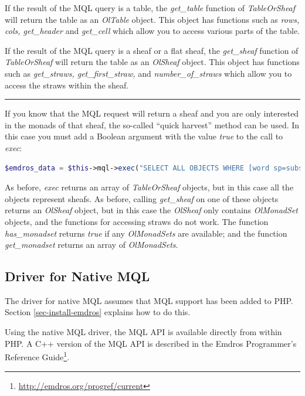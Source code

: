 \documentclass[11pt,oneside,a4paper]{memoir}
\begin{document}
If the result of the MQL query is a table, the \emph{get\_table} function of \emph{TableOrSheaf}
will return the table as an \emph{OlTable} object.  This object has functions
such as \emph{rows, cols, get\_header} and \emph{get\_cell} which allow you to
access various parts of the table.

If the result of the MQL query is a sheaf or a flat sheaf, the \emph{get\_sheaf} function of
\emph{TableOrSheaf} will return the table as an \emph{OlSheaf} object. This object has functions
such as \emph{get\_straws, get\_first\_straw,} and \emph{number\_of\_straws} which allow you to
access the straws within the sheaf.

\pfbreak

If you know that the MQL request will return a sheaf and you are only interested in the monads of
that sheaf, the so-called ``quick harvest'' method can be used. In
this case you must add a Boolean argument with the value \emph{true} to the call to \emph{exec}:

\begin{lstlisting}[language=PHP]
$emdros_data = $this->mql->exec("SELECT ALL OBJECTS WHERE [word sp=subs] GOqxqxqx", true);
\end{lstlisting}

As before, \emph{exec} returns an array of \emph{TableOrSheaf} objects, but in this case all the
objects represent sheafs. As before, calling \emph{get\_sheaf} on one of these objects returns an
\emph{OlSheaf} object, but in this case the \emph{OlSheaf} only contains \emph{OlMonadSet} objects, and the
functions for accessing straws do not work. The function \emph{has\_monadset} returns \emph{true} if
any \emph{OlMonadSets} are available; and the function \emph{get\_monadset} returns an array of
\emph{OlMonadSets}.

\subsection{Driver for Native MQL}\label{sec-mql-native}

The driver for native MQL assumes that MQL support has been added to PHP. Section
\ref{sec-install-emdros} explains how to do this.

Using the native MQL driver, the MQL API is available directly from within PHP. A C++
version of the MQL API is described in the Emdros Programmer's Reference
Guide\footnote{\url{http://emdros.org/progref/current}}.
\end{document}
